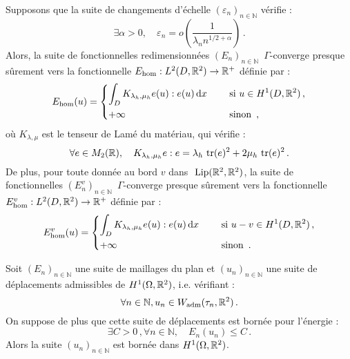 \begin{theorem}
    Supposons que la suite de changements d’échelle $(\varepsilon_n)_{n \in \mathbb{N}}$ vérifie :
    \[ \exists \alpha > 0, \quad \varepsilon_n = o\left(  \frac{1}{\lambda_n n^{1/2 + \alpha}}
    \right) \,. \]
    Alors, la suite de fonctionnelles redimensionnées $(E_n)_{n \in \mathbb{N}}$ $\,
    \Gamma$-converge
    presque sûrement vers la fonctionnelle $E_{\text{\upshape hom}} : L^2(D, \mathbb{R}^2) \rightarrow
    \mathbb{R}^+$ définie  par :
    \begin{align*}
        E_{\text{\upshape hom}}(u)  =
        \begin{dcases}
                          \int_{D} K_{\lambda_h,\mu_h} e(u):e(u) \diff x &\quad \text{      \upshape si } u \in H^1(D,
                          \Rdeux) \,, \\
                          + \infty &\quad  \text{      \upshape sinon }\,,
        \end{dcases}
    \end{align*}
    où $K_{\lambda,\mu}$ est le tenseur de Lamé du matériau, qui vérifie :
    \[\forall e \in M_2(\mathbb{R}), \quad K_{\lambda_h,\mu_h} e: e = \lambda_h \text{ \upshape tr}(e)^2 + 2 \mu_h \text{ \upshape tr}(e)^2 \,. \]
    De plus, pour toute donnée au bord $v$ dans $\text{  \upshape Lip}(\mathbb{R}^2, \mathbb{R}^2)$, la suite de
    fonctionnelles $(E^v_n)_{n \in \mathbb{N}}$ $\, \Gamma$-converge presque sûrement vers la
    fonctionnelle  $E^v_{\hom} : L^2(D, \mathbb{R}^2) \rightarrow \mathbb{R}^+ $ définie par :
    \begin{align*}
        E^v_{\text{\upshape hom}}(u)  =  \begin{dcases}
                          \int_D K_{\lambda_h,\mu_h} e(u):e(u) \diff x &\quad \text{  \upshape si } u - v \in
                          H^1(D,
                          \Rdeux) \,, \\
                          + \infty &\quad \text{  \upshape sinon }\,.
        \end{dcases}
    \end{align*}
\end{theorem}

\begin{theorem}
    Soit $(E_n)_{n \in \mathbb{N}}$ une suite de maillages du plan et $(u_n)_{n \in \mathbb{N}}$
    une suite de déplacements admissibles de $H^1(\Omega, \mathbb{R}^2)$, i.e. vérifiant :
    $$\forall n \in \mathbb{N}, u_n \in W_{\text{\upshape adm}} (\tau_n, \mathbb{R}^2) \,.$$
    On suppose de plus que cette suite de déplacements est bornée pour l’énergie :
    $$ \exists C > 0\,, \forall n \in \mathbb{N}, \quad E_n(u_n) \leq C \,. $$
    Alors la suite $(u_n)_{n \in \mathbb{N}}$ est bornée dans $H^1(\Omega, \mathbb{R}^2)$.
\end{theorem}






